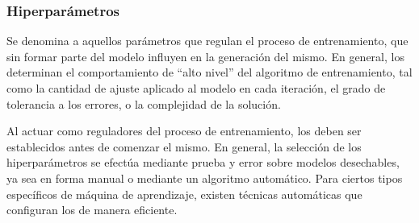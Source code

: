 %
\subsubsection{Hiperparámetros}
%
Se denomina  a aquellos parámetros que regulan el 
proceso de entrenamiento, que sin formar parte del modelo influyen en
la generación del mismo.
En general, los  determinan el comportamiento de ``alto nivel''
del algoritmo de entrenamiento, tal como la cantidad de ajuste aplicado al
modelo en cada iteración, el grado de tolerancia a los errores, o la
complejidad de la solución.

Al actuar como reguladores del proceso de entrenamiento, los 
deben ser establecidos antes de comenzar el mismo.
En general, la selección de los hiperparámetros se efectúa mediante prueba
y error sobre modelos desechables, ya sea en forma manual o mediante un
algoritmo automático.
Para ciertos tipos específicos de máquina de aprendizaje, existen técnicas
automáticas que configuran los  de manera eficiente.
